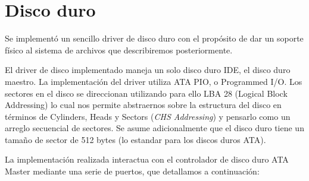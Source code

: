 \section{Disco duro}
\label{sec::disk}

Se implement\'o un sencillo driver de disco duro con el prop\'osito de dar un soporte
f\'isico al sistema de archivos que describiremos posteriormente.

El driver de disco implementado maneja un solo disco duro IDE, el disco duro maestro.
La implementaci\'on del driver utiliza ATA PIO, o Programmed I/O. Los sectores en el
disco se direccionan utilizando para ello LBA 28 (Logical Block Addressing) lo cual
nos permite abstraernos sobre la estructura del disco en t\'erminos de Cylinders, Heads
y Sectors (\textit{CHS Addressing}) y pensarlo como un arreglo secuencial de sectores.
Se asume adicionalmente que el disco duro tiene un tama\~no de sector de 512 bytes (lo
estandar para los discos duros ATA).

La implementaci\'on realizada interactua con el controlador de disco duro ATA Master
mediante una serie de puertos, que detallamos a continuaci\'on:

